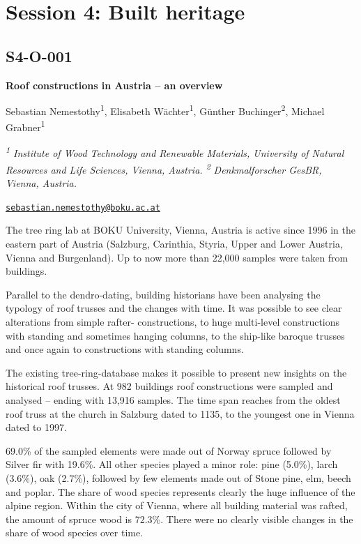 \documentclass[
]{book}
\begin{document}
\hypertarget{session-4-built-heritage}{%
\chapter*{Session 4: Built heritage}\label{session-4-built-heritage}}

\hypertarget{s4-o-001}{%
\section*{S4-O-001}\label{s4-o-001}}

\textbf{Roof constructions in Austria -- an overview}

Sebastian Nemestothy\textsuperscript{1}, Elisabeth Wächter\textsuperscript{1}, Günther Buchinger\textsuperscript{2}, Michael Grabner\textsuperscript{1}

\emph{\textsuperscript{1} Institute of Wood Technology and Renewable Materials, University of Natural Resources and Life Sciences, Vienna, Austria. \textsuperscript{2} Denkmalforscher GesBR, Vienna, Austria.}

\href{mailto:sebastian.nemestothy@boku.ac.at}{\nolinkurl{sebastian.nemestothy@boku.ac.at}}

The tree ring lab at BOKU University, Vienna, Austria is active since 1996 in the eastern part of Austria (Salzburg, Carinthia, Styria, Upper and Lower Austria, Vienna and Burgenland). Up to now more than 22,000 samples were taken from buildings.

Parallel to the dendro-dating, building historians have been analysing the typology of roof trusses and the changes with time. It was possible to see clear alterations from simple rafter- constructions, to huge multi-level constructions with standing and sometimes hanging columns, to the ship-like baroque trusses and once again to constructions with standing columns.

The existing tree-ring-database makes it possible to present new insights on the historical roof trusses. At 982 buildings roof constructions were sampled and analysed -- ending with 13,916 samples. The time span reaches from the oldest roof truss at the church in Salzburg dated to 1135, to the youngest one in Vienna dated to 1997.

69.0\% of the sampled elements were made out of Norway spruce followed by Silver fir with 19.6\%. All other species played a minor role: pine (5.0\%), larch (3.6\%), oak (2.7\%), followed by few elements made out of Stone pine, elm, beech and poplar. The share of wood species represents clearly the huge influence of the alpine region. Within the city of Vienna, where all building material was rafted, the amount of spruce wood is 72.3\%. There were no clearly visible changes in the share of wood species over time.
\end{document}

